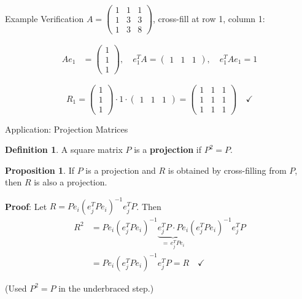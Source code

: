 \documentclass[10pt]{beamer}
\theoremstyle{definition}
\newtheorem{defi}{Definition}[section]
\newtheorem{prop}{Proposition}[section]
\newcommand{\x}[1]{\alert{\textbf{#1}}}
\begin{document}
\begin{frame}{Example Verification}
$A = \begin{pmatrix} 1 & 1 & 1 \\ 1 & 3 & 3 \\ 1 & 3 & 8 \end{pmatrix}$, \quad cross-fill at row 1, column 1:

\vfill
\begin{align*}
Ae_1 &= \begin{pmatrix} 1 \\ 1 \\ 1 \end{pmatrix}, \quad
e_1^T A = \begin{pmatrix} 1 & 1 & 1 \end{pmatrix}, \quad
e_1^T A e_1 = 1
\end{align*}

$$R_1 = \begin{pmatrix} 1 \\ 1 \\ 1 \end{pmatrix} \cdot 1 \cdot \begin{pmatrix} 1 & 1 & 1 \end{pmatrix}
= \begin{pmatrix}
1 & 1 & 1 \\
1 & 1 & 1 \\
1 & 1 & 1
\end{pmatrix} \quad \checkmark$$
\end{frame}

\begin{frame}{Application: Projection Matrices}
\begin{defi}
A square matrix $P$ is a \x{projection} if $P^2 = P$.
\end{defi}

\vfill
\begin{prop}
If $P$ is a projection and $R$ is obtained by cross-filling from $P$, then $R$ is also a projection.
\end{prop}

\vfill
\textbf{Proof}: Let $R = Pe_i(e_j^TPe_i)^{-1}e_j^TP$. Then
\begin{align*}
R^2 &= Pe_i(e_j^TPe_i)^{-1} \underbrace{e_j^T P \cdot P e_i}_{= \, e_j^TPe_i} (e_j^TPe_i)^{-1}e_j^TP \\
&= Pe_i(e_j^TPe_i)^{-1}e_j^TP = R \quad \checkmark
\end{align*}

(Used $P^2 = P$ in the underbraced step.)
\end{frame}
\end{document}

